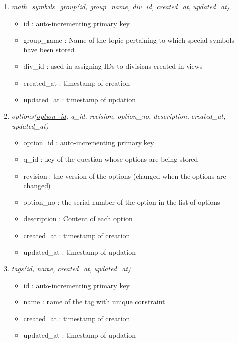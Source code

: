 \documentclass[a4paper,12pt,oneside]{book}
\begin{document}
\begin{enumerate}
            \item \textit{math\_symbols\_group(\underline{id}, group\_name, div\_id, created\_at, updated\_at)}
                \begin{itemize}
                  \item id : auto-incrementing primary key
                  \item group\_name : Name of the topic pertaining to which special symbols have been stored
                  \item div\_id : used in assigning IDs to divisions created in views
                  \item created\_at : timestamp of creation
                  \item updated\_at : timestamp of updation 
                \end{itemize}
                
            \item \textit{options(\underline{option\_id}, q\_id, revision, option\_no, description, created\_at, updated\_at)}
                \begin{itemize}
                  \item option\_id : auto-incrementing primary key
                  \item q\_id : key of the question whose options are being stored
                  \item revision : the version of the options (changed when the options are changed)
                  \item option\_no : the serial number of the option in the list of options
                  \item description : Content of each option 
                  \item created\_at : timestamp of creation
                  \item updated\_at : timestamp of updation 
                \end{itemize}
                
            \item \textit{tags(\underline{id}, name, created\_at, updated\_at)}
                \begin{itemize}
                  \item id : auto-incrementing primary key
                  \item name : name of the tag with unique constraint 
                  \item created\_at : timestamp of creation
                  \item updated\_at : timestamp of updation 
                \end{itemize}
                

\end{enumerate}
\end{document}
